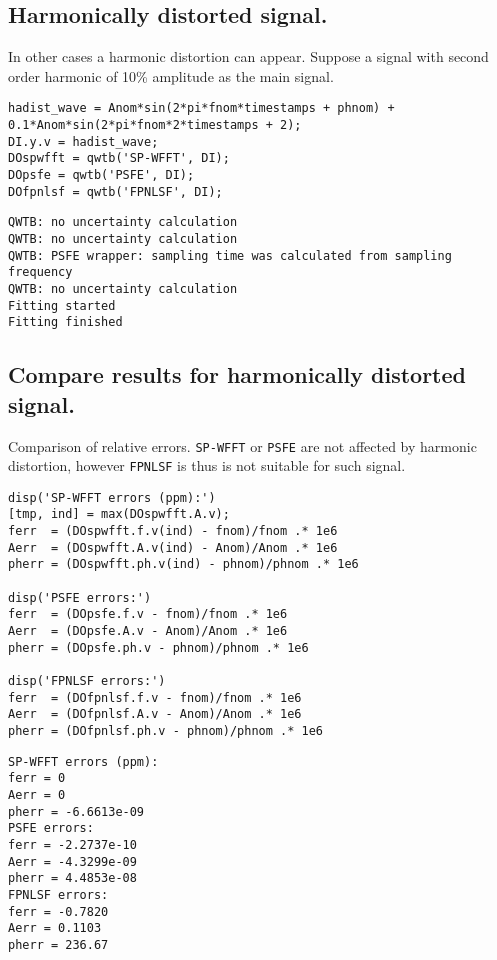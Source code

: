 {}
\subsection*{Harmonically distorted signal.}



In other cases a harmonic distortion can appear. Suppose a signal with second
order harmonic of 10\% amplitude as the main signal.

\begin{lstlisting}
hadist_wave = Anom*sin(2*pi*fnom*timestamps + phnom) + 0.1*Anom*sin(2*pi*fnom*2*timestamps + 2);
DI.y.v = hadist_wave;
DOspwfft = qwtb('SP-WFFT', DI);
DOpsfe = qwtb('PSFE', DI);
DOfpnlsf = qwtb('FPNLSF', DI);
\end{lstlisting}
\begin{lstlisting}[language={},xleftmargin=5pt,frame=none]
QWTB: no uncertainty calculation
QWTB: no uncertainty calculation
QWTB: PSFE wrapper: sampling time was calculated from sampling frequency
QWTB: no uncertainty calculation
Fitting started
Fitting finished

\end{lstlisting}


{}
\subsection*{Compare results for harmonically distorted signal.}



Comparison of relative errors. \texttt{SP-WFFT} or \texttt{PSFE} are not affected by harmonic
distortion, however \texttt{FPNLSF} is thus is not suitable for such signal.

\begin{lstlisting}
disp('SP-WFFT errors (ppm):')
[tmp, ind] = max(DOspwfft.A.v);
ferr  = (DOspwfft.f.v(ind) - fnom)/fnom .* 1e6
Aerr  = (DOspwfft.A.v(ind) - Anom)/Anom .* 1e6
pherr = (DOspwfft.ph.v(ind) - phnom)/phnom .* 1e6

disp('PSFE errors:')
ferr  = (DOpsfe.f.v - fnom)/fnom .* 1e6
Aerr  = (DOpsfe.A.v - Anom)/Anom .* 1e6
pherr = (DOpsfe.ph.v - phnom)/phnom .* 1e6

disp('FPNLSF errors:')
ferr  = (DOfpnlsf.f.v - fnom)/fnom .* 1e6
Aerr  = (DOfpnlsf.A.v - Anom)/Anom .* 1e6
pherr = (DOfpnlsf.ph.v - phnom)/phnom .* 1e6
\end{lstlisting}
\begin{lstlisting}[language={},xleftmargin=5pt,frame=none]
SP-WFFT errors (ppm):
ferr = 0
Aerr = 0
pherr = -6.6613e-09
PSFE errors:
ferr = -2.2737e-10
Aerr = -4.3299e-09
pherr = 4.4853e-08
FPNLSF errors:
ferr = -0.7820
Aerr = 0.1103
pherr = 236.67

\end{lstlisting}



